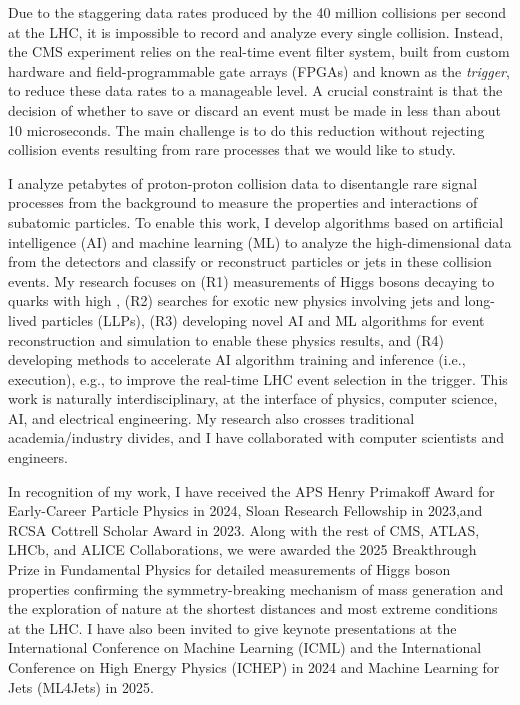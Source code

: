 \documentclass[11pt,letterpaper,notitlepage]{article}
\begin{document}
Due to the staggering data rates produced by the 40 million collisions per second at the LHC, it is impossible to record and analyze every single collision.
Instead, the CMS experiment relies on the real-time event filter system, built from custom hardware and field-programmable gate arrays (FPGAs) and known as the \emph{trigger}, to reduce these data rates to a manageable level.
A crucial constraint is that the decision of whether to save or discard an event must be made in less than about 10 microseconds.
The main challenge is to do this reduction without rejecting collision events resulting from rare processes that we would like to study.

I analyze petabytes of proton-proton collision data to disentangle rare signal processes from the background to measure the properties and interactions of subatomic particles.
To enable this work, I develop algorithms based on artificial intelligence (AI) and machine learning (ML) to analyze the high-dimensional data from the detectors and classify or reconstruct particles or jets in these collision events.
My research focuses on
(R1) measurements of Higgs bosons decaying to quarks with high \pt,
(R2) searches for exotic new physics involving jets and long-lived particles (LLPs),
(R3) developing novel AI and ML algorithms for event reconstruction and simulation to enable these physics results, and
(R4) developing methods to accelerate AI algorithm training and inference (i.e., execution), e.g., to improve the real-time LHC event selection in the trigger.
This work is naturally interdisciplinary, at the interface of physics, computer science, AI, and electrical engineering.
My research also crosses traditional academia/industry divides, and I have collaborated with computer scientists and engineers.

In recognition of my work, I have received the APS Henry Primakoff Award for Early-Career Particle Physics in 2024, Sloan Research Fellowship in 2023,and RCSA Cottrell Scholar Award in 2023.
Along with the rest of CMS, ATLAS, LHCb, and ALICE Collaborations, we were awarded the 2025 Breakthrough Prize in Fundamental Physics for detailed measurements of Higgs boson properties confirming the symmetry-breaking mechanism of mass generation and the exploration of nature at the shortest distances and most extreme conditions at the LHC.
I have also been invited to give keynote presentations at the International Conference on Machine Learning (ICML) and the International Conference on High Energy Physics (ICHEP) in 2024 and Machine Learning for Jets (ML4Jets) in 2025.
\end{document}
